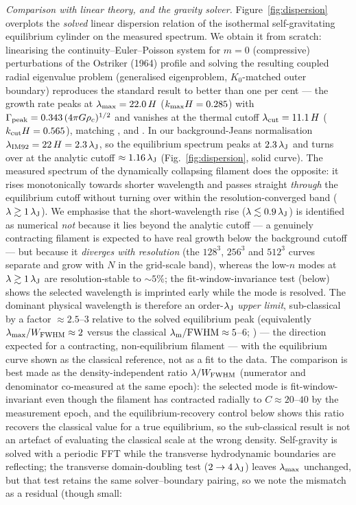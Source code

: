 \documentclass[usenatbib,twoside,twocolumn]{mnras}
\begin{document}
\emph{Comparison with linear theory, and the gravity solver.} Figure~\ref{fig:dispersion} overplots the \emph{solved} linear dispersion relation of the isothermal self-gravitating equilibrium cylinder on the measured spectrum. We obtain it from scratch: linearising the continuity--Euler--Poisson system for $m=0$ (compressive) perturbations of the Ostriker (1964) profile and solving the resulting coupled radial eigenvalue problem (generalised eigenproblem, $K_0$-matched outer boundary) reproduces the standard result to better than one per cent --- the growth rate peaks at $\lambda_{\rm max}=22.0\,H$ ($k_{\rm max}H=0.285$) with $\Gamma_{\rm peak}=0.343\,(4\pi G\rho_c)^{1/2}$ and vanishes at the thermal cutoff $\lambda_{\rm cut}=11.1\,H$ ($k_{\rm cut}H=0.565$), matching \citet{Nagasawa1987}, \citet{Inutsuka1992} and \citet{Fischera2012}. In our background-Jeans normalisation $\lambda_{\rm IM92}=22\,H=2.3\,\lambda_{\rm J}$, so the equilibrium spectrum peaks at $2.3\,\lambda_{\rm J}$ and turns over at the analytic cutoff $\approx1.16\,\lambda_{\rm J}$ (Fig.~\ref{fig:dispersion}, solid curve). The measured spectrum of the dynamically collapsing filament does the opposite: it rises monotonically towards shorter wavelength and passes straight \emph{through} the equilibrium cutoff without turning over within the resolution-converged band ($\lambda\gtrsim1\,\lambda_{\rm J}$). We emphasise that the short-wavelength rise ($\lambda\lesssim0.9\,\lambda_{\rm J}$) is identified as numerical \emph{not} because it lies beyond the analytic cutoff --- a genuinely contracting filament is expected to have real growth below the background cutoff --- but because it \emph{diverges with resolution} (the $128^3$, $256^3$ and $512^3$ curves separate and grow with $N$ in the grid-scale band), whereas the low-$n$ modes at $\lambda\gtrsim1\,\lambda_{\rm J}$ are resolution-stable to $\sim5\%$; the fit-window-invariance test (below) shows the selected wavelength is imprinted early while the mode is resolved. The dominant physical wavelength is therefore an order-$\lambda_{\rm J}$ \emph{upper limit}, sub-classical by a factor $\approx2.5$--$3$ relative to the solved equilibrium peak (equivalently $\lambda_{\rm max}/W_{\rm FWHM}\approx2$ versus the classical $\lambda_{\rm m}/{\rm FWHM}\approx5$--$6$; \citealt{Fischera2012}) --- the direction expected for a contracting, non-equilibrium filament \citep{Clarke2016,Clarke2017} --- with the equilibrium curve shown as the classical reference, not as a fit to the data. The comparison is best made as the density-independent ratio $\lambda/W_{\rm FWHM}$ (numerator and denominator co-measured at the same epoch): the selected mode is fit-window-invariant even though the filament has contracted radially to $C\approx20$--$40$ by the measurement epoch, and the equilibrium-recovery control below shows this ratio recovers the classical value for a true equilibrium, so the sub-classical result is not an artefact of evaluating the classical scale at the wrong density. Self-gravity is solved with a periodic FFT while the transverse hydrodynamic boundaries are reflecting; the transverse domain-doubling test ($2\to4\,\lambda_{\rm J}$) leaves $\lambda_{\rm max}$ unchanged, but that test retains the same solver--boundary pairing, so we note the mismatch as a residual (though small: 
\end{document}
